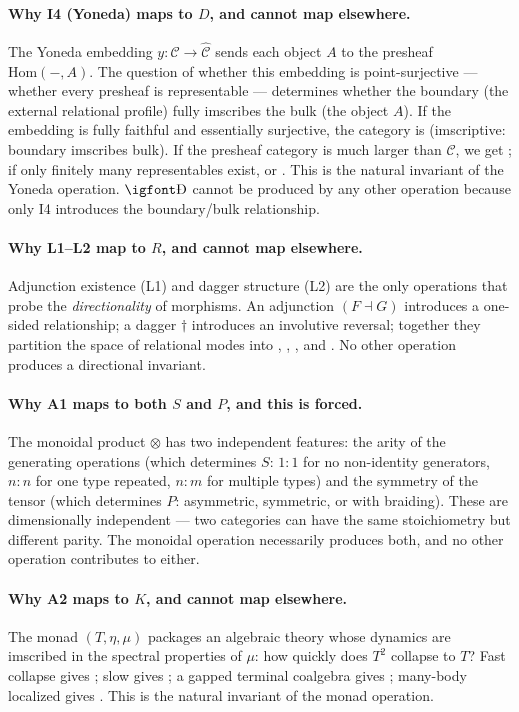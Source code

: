 \documentclass[12pt,a4paper]{article}
\newcommand{\igprimfont}{\igfont\upshape}
\begin{document}
\paragraph{Why I4 (Yoneda) maps to $D$, and cannot map elsewhere.}
The Yoneda embedding $y: \mathcal{C} \to \hat{\mathcal{C}}$ sends each object $A$ to the presheaf $\text{Hom}(-,A)$. The question of whether this embedding is point-surjective --- whether every presheaf is representable --- determines whether the boundary (the external relational profile) fully imscribes the bulk (the object $A$). If the embedding is fully faithful and essentially surjective, the category is  (imscriptive: boundary imscribes bulk). If the presheaf category is much larger than $\mathcal{C}$, we get ; if only finitely many representables exist,  or . This is the natural invariant of the Yoneda operation. $\text{{\igprimfont Ð}}$ cannot be produced by any other operation because only I4 introduces the boundary/bulk relationship.

\paragraph{Why L1--L2 map to $R$, and cannot map elsewhere.}
Adjunction existence (L1) and dagger structure (L2) are the only operations that probe the \emph{directionality} of morphisms. An adjunction $(F \dashv G)$ introduces a one-sided relationship; a dagger $\dagger$ introduces an involutive reversal; together they partition the space of relational modes into , , , and . No other operation produces a directional invariant.

\paragraph{Why A1 maps to both $S$ and $P$, and this is forced.}
The monoidal product $\otimes$ has two independent features: the arity of the generating operations (which determines $S$: $1{:}1$ for no non-identity generators, $n{:}n$ for one type repeated, $n{:}m$ for multiple types) and the symmetry of the tensor (which determines $P$: asymmetric, symmetric, or with braiding). These are dimensionally independent --- two categories can have the same stoichiometry but different parity. The monoidal operation necessarily produces both, and no other operation contributes to either.

\paragraph{Why A2 maps to $K$, and cannot map elsewhere.}
The monad $(T, \eta, \mu)$ packages an algebraic theory whose dynamics are imscribed in the spectral properties of $\mu$: how quickly does $T^2$ collapse to $T$? Fast collapse gives ; slow gives ; a gapped terminal coalgebra gives ; many-body localized gives . This is the natural invariant of the monad operation.
\end{document}
